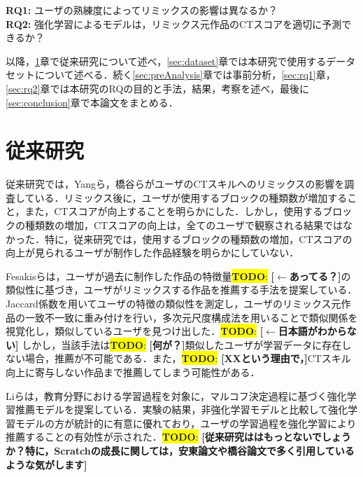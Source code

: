 \documentclass[submit,techrep,noauthor]{ipsj}
\newcommand{\todo}[1]{\colorbox{yellow}{{\bf TODO}:}{\color{red} {\textbf{[#1]}}}}
\begin{document}
\noindent\textbf{RQ1: }ユーザの熟練度によってリミックスの影響は異なるか？\\
\noindent\textbf{RQ2: }強化学習によるモデルは，リミックス元作品のCTスコアを適切に予測できるか？


以降，\ref{sec:related}章で従来研究について述べ，\ref{sec:dataset}章では本研究で使用するデータセットについて述べる．続く\ref{sec:preAnalysis}章では事前分析，\ref{sec:rq1}章，\ref{sec:rq2}章では本研究のRQの目的と手法，結果，考察を述べ，最後に\ref{sec:conclusion}章で本論文をまとめる．

\section{従来研究}
\label{sec:related}

従来研究では，Yangら\cite{10.1145/2724660.2724674}，橋谷ら\cite{hashitani2022scratch}がユーザのCTスキルへのリミックスの影響を調査している．リミックス後に，ユーザが使用するブロックの種類数が増加すること，また，CTスコアが向上することを明らかにした．しかし，使用するブロックの種類数の増加，CTスコアの向上は，全てのユーザで観察される結果ではなかった．特に，従来研究では，使用するブロックの種類数の増加，CTスコアの向上が見られるユーザが制作した作品経験を明らかにしていない．

Fesakisらは，ユーザが過去に制作した作品の特徴量\todo{$\leftarrow$あってる？}の類似性に基づき，ユーザがリミックスする作品を推薦する手法を提案している\cite{fesakis2009proposing}．Jaccard係数を用いてユーザの特徴の類似性を測定し，ユーザのリミックス元作品の一致不一致に重み付けを行い，多次元尺度構成法を用いることで類似関係を視覚化し，類似しているユーザを見つけ出した．\todo{$\leftarrow$日本語がわからない}
しかし，当該手法は\todo{何が？}類似したユーザが学習データに存在しない場合，推薦が不可能である．また，\todo{XXという理由で，}CTスキル向上に寄与しない作品まで推薦してしまう可能性がある．



Liらは，教育分野における学習過程を対象に，マルコフ決定過程に基づく強化学習推薦モデルを提案している\cite{10.1145/3637528.3671872}．実験の結果，非強化学習モデルと比較して強化学習モデルの方が統計的に有意に優れており，ユーザの学習過程を強化学習により推薦することの有効性が示された．\todo{従来研究ははもっとないでしょうか？特に，Scratchの成長に関しては，安東論文や橋谷論文で多く引用しているような気がします}
\end{document}
